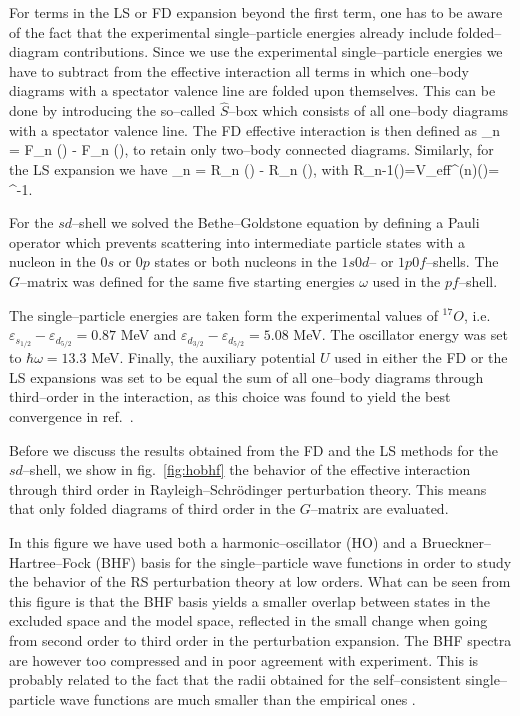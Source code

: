 For terms in the LS or FD expansion beyond the first term,
one has to be aware of the fact that the experimental single--particle energies
already include folded--diagram contributions. Since we use the
experimental single--particle energies we have to subtract from the effective
interaction all terms in which one--body diagrams with a spectator valence line
are folded upon themselves.
This can be done by introducing the
so--called $\hat{S}$--box which consists of all one--body diagrams with a
spectator valence line. The FD effective interaction is then defined as
\be
{}_n = F_n () - F_n (),
\label{eq:fdtilde}
\ee
to retain only two--body connected diagrams. Similarly, for the LS
expansion we have
\be
{}_n = R_n () - R_n (),
\label{eq:lstilde}
\ee
with
\be
R_{n-1}()=V_{eff}^{(n)}()=
\left[1-\hat{S}_{1}-\sum_{m=2}^{n}\hat{S}_{m}
\prod_{k=n-m+1}^{n-1}V_{eff}^{(k)}(\hat{S})\right]^{-1}.
\ee

For the $sd$--shell we solved the Bethe--Goldstone equation by defining
a Pauli operator which prevents scattering into intermediate particle states
with a nucleon in the $0s$ or $0p$ states or both nucleons in the $1s0d$--
or $1p0f$--shells. The $G$--matrix was defined for the same 
five starting energies
$\omega$ used in the $pf$--shell.

The single--particle energies are taken form the experimental values of
$^{17}O$, i.e. $\varepsilon_{s_{1/2}}-\varepsilon_{d_{5/2}}=0.87$ MeV
and $\varepsilon_{d_{3/2}}-\varepsilon_{d_{5/2}}=5.08$ MeV. The oscillator
energy was set to $\hbar\omega = 13.3$ MeV. Finally, the auxiliary potential
$U$ used in either the FD or the LS expansions was set to be equal the sum
of all one--body diagrams through third--order in the interaction, as this choice
was found to yield the best convergence in ref.\ \cite{hom92}.


Before we discuss the results obtained from the FD and the LS methods
for the $sd$--shell, we show in fig.\ \ref{fig:hobhf} the behavior
of the effective interaction through third order in
Rayleigh--Schr\"{o}dinger perturbation theory. This means that only folded
diagrams of third order in the $G$--matrix are evaluated.


In this figure we have used both a harmonic--oscillator (HO)
and a Brueckner--Hartree--Fock (BHF) basis for the
single--particle wave functions in order to study the behavior
of the RS perturbation theory at low orders. What can be seen from this
figure is that the BHF basis yields a smaller overlap between
states in the excluded space and the model space, reflected in the small
change when going from second order to third order in the perturbation
expansion. The BHF spectra are however too compressed and in poor
agreement with experiment. This is probably related to the fact that
the radii obtained for the self--consistent single--particle wave functions
are much smaller than the empirical ones \cite{homs90}.

